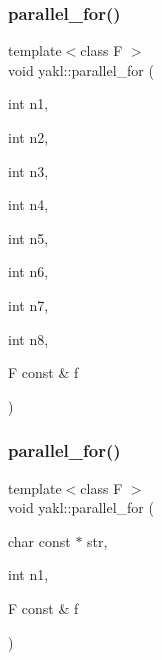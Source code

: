 \subsubsection{\texorpdfstring{parallel\+\_\+for()}{parallel\_for()}\hspace{0.1cm}{\footnotesize\ttfamily [8/16]}}
{\footnotesize\ttfamily template$<$class F $>$ \\
void yakl\+::parallel\+\_\+for (\begin{DoxyParamCaption}\item[{int}]{n1,  }\item[{int}]{n2,  }\item[{int}]{n3,  }\item[{int}]{n4,  }\item[{int}]{n5,  }\item[{int}]{n6,  }\item[{int}]{n7,  }\item[{int}]{n8,  }\item[{F const \&}]{f }\end{DoxyParamCaption})\hspace{0.3cm}{\ttfamily [inline]}}

\mbox{\label{namespaceyakl_ad29eaf71e4867503e62bd44e3ed0d10a}} 
\subsubsection{\texorpdfstring{parallel\+\_\+for()}{parallel\_for()}\hspace{0.1cm}{\footnotesize\ttfamily [9/16]}}
{\footnotesize\ttfamily template$<$class F $>$ \\
void yakl\+::parallel\+\_\+for (\begin{DoxyParamCaption}\item[{char const $\ast$}]{str,  }\item[{int}]{n1,  }\item[{F const \&}]{f }\end{DoxyParamCaption})\hspace{0.3cm}{\ttfamily [inline]}}

\mbox{\label{namespaceyakl_a33ca6c48b3eabba7ae05942764b29d89}} 
